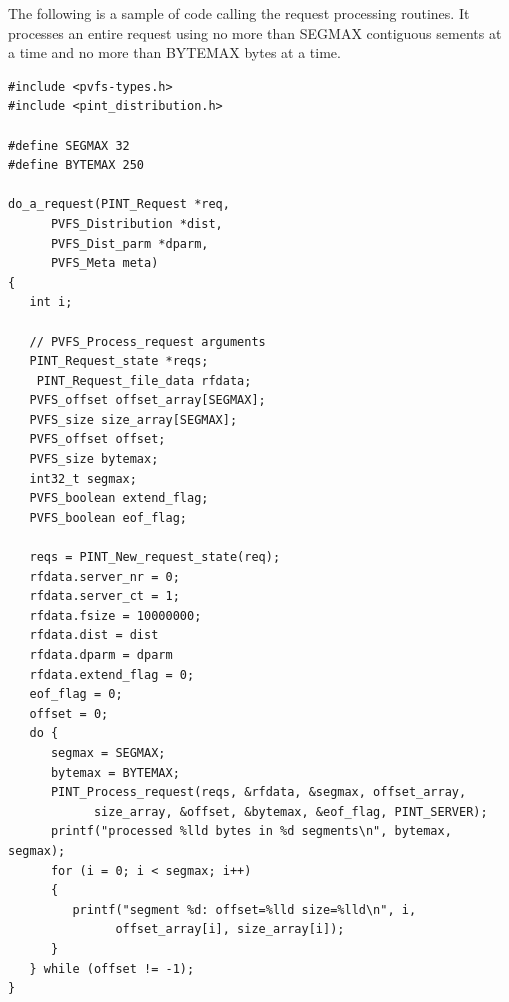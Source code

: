 \documentclass[12pt]{article} %
\begin{document}
The following is a sample of code calling the request processing
routines.  It processes an entire request using no more than SEGMAX
contiguous sements at a time and no more than BYTEMAX bytes at a time.

\begin{verbatim}
#include <pvfs-types.h>
#include <pint_distribution.h>

#define SEGMAX 32
#define BYTEMAX 250

do_a_request(PINT_Request *req,
      PVFS_Distribution *dist,
      PVFS_Dist_parm *dparm,
      PVFS_Meta meta)
{
   int i;

   // PVFS_Process_request arguments
   PINT_Request_state *reqs;
	PINT_Request_file_data rfdata;
   PVFS_offset offset_array[SEGMAX];
   PVFS_size size_array[SEGMAX];
   PVFS_offset offset;
   PVFS_size bytemax;
   int32_t segmax;
   PVFS_boolean extend_flag;
   PVFS_boolean eof_flag;

   reqs = PINT_New_request_state(req);
   rfdata.server_nr = 0;
   rfdata.server_ct = 1;
   rfdata.fsize = 10000000;
   rfdata.dist = dist
   rfdata.dparm = dparm
   rfdata.extend_flag = 0;
   eof_flag = 0;
   offset = 0;
   do {
      segmax = SEGMAX;
      bytemax = BYTEMAX;
      PINT_Process_request(reqs, &rfdata, &segmax, offset_array,
            size_array, &offset, &bytemax, &eof_flag, PINT_SERVER);
      printf("processed %lld bytes in %d segments\n", bytemax, segmax);
      for (i = 0; i < segmax; i++)
      {
         printf("segment %d: offset=%lld size=%lld\n", i,
               offset_array[i], size_array[i]);
      }
   } while (offset != -1);
}
\end{verbatim}
\end{document}
